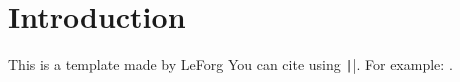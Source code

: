 \chapter*{Introduction}

This is a template made by LeForg \emph{\citep{leforg}}
You can cite using \texttt|\citep{ID}|. For example: \citep{Norman}.